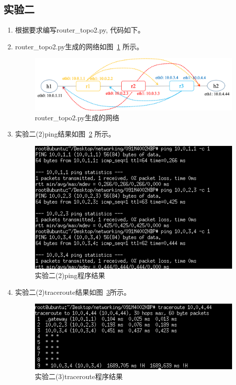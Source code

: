 \documentclass{zjureport}
\begin{document}
  \subsection{实验二}
      \begin{enumerate}
          \item 根据要求编写router\_topo2.py, 代码如下。
                

          \item router\_topo2.py生成的网络如图~\ref{fig:rtpy2} 所示。
                \begin{figure}[!htbp]
                    \centering
                    \includegraphics[width=0.9\linewidth]{figures/rtpy2.png}
                    \caption{router\_topo2.py生成的网络}
                    \label{fig:rtpy2}
                \end{figure}

          \item 实验二(2)ping结果如图~\ref{fig:e2pingresult} 所示。
                \begin{figure}[!htbp]
                    \centering
                    \includegraphics[width=0.7\linewidth]{figures/e2result1.png}
                    \caption{实验二(2)ping程序结果}
                    \label{fig:e2pingresult}
                \end{figure}

         \item 实验二(2)traceroute结果如图~\ref{fig:e2tracerouteresult}所示。
               \begin{figure}[!htbp]
                   \centering
                   \includegraphics[width=0.7\linewidth]{figures/e2result2.png}
                   \caption{实验二(3)traceroute程序结果}
                   \label{fig:e2tracerouteresult}
               \end{figure}


\end{enumerate}
\end{document}
